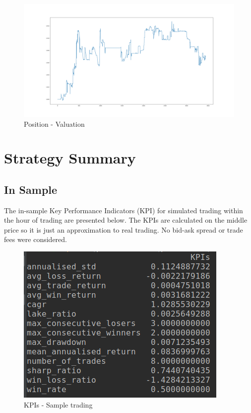 \documentclass[12pt]{article}
\begin{document}
\begin{figure}[h!]
	\centering
  \includegraphics[width=\textwidth]{strategy6.png}
  \caption{Position - Valuation}
  \label{fig:strat6}
\end{figure}

\FloatBarrier
\section*{Strategy Summary}
\subsection*{In Sample}
The in-sample Key Performance Indicators (KPI) for simulated trading within the hour of trading are presented below. The KPIs are calculated on the middle price so it is just an approximation to real trading. No bid-ask spread or trade fees were considered.

\begin{figure}[h!]
	\centering
  \includegraphics[scale=0.4]{sample_kpis.png}
  \caption{KPIs - Sample trading}
  \label{fig:kpi1}
\end{figure}
\FloatBarrier
\end{document}
